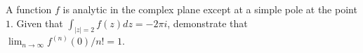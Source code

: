 A function $f$ is analytic in the complex plane except at a simple
pole at the point $1$. Given that $\int_{|z|=2}f(z)dz=-2\pi i$,
demonstrate that $\lim_{n\rightarrow \infty} f^{(n)}(0)/n!=1$.
